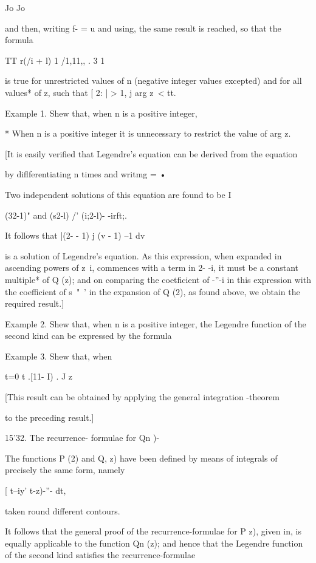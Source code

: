 {{Jo Jo

and then, writing f- = u and using, the same result is
reached, so that the formula

TT r(/i + l) 1 /1,11,, . 3 1

is true for unrestricted values of n (negative integer values
excepted) and for all values* of z, such that [ 2: | > 1, j arg z\ <
tt.

Example 1. Shew that, when n is a positive integer,

* When n is a positive integer it is unnecessary to restrict the value
of arg z.

%
%

[It is easily verified that Legendre's equation can be derived from
the equation

by diflferentiating n times and writmg = •

Two independent solutions of this equation are found to be I

(32-1)" and (s2-l) /' (i;2-l)- -irft;.

It follows that |(2- - 1) j (v - 1) --1 dv

is a solution of Legendre's equation. As this expression, when
expanded in ascending powers of z~i, commences with a term in 2- -i,
it must be a constant multiple* of Q (z); and on comparing the
coetficient of -''-i in this expression with the coefficient of s~"~'
in the expansion of Q (2), as found above, we obtain the required
result.]

Example 2. Shew that, when n is a positive integer, the Legendre
function of the second kind can be expressed by the formula

Example 3. Shew that, when %

t=0 t .[11- I) . J z

[This result can be obtained by applying the general integration
-theorem

to the preceding result.]

15'32. The recurrence- formulae for Qn )-

The functions P (2) and Q, z) have been defined by means of integrals
of precisely the same form, namely

[ t--iy' t-z)-''- dt,

taken round different contours.

It follows that the general proof of the recurrence-formulae for P z),
given in, is equally applicable to the function Qn (z); and
hence that the Legendre function of the second kind satisfies the
recurrence-formulae

}}
